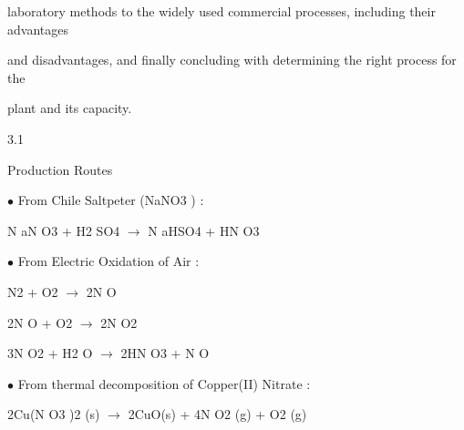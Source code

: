 \documentclass[a4paper,portrait,12pt]{article}
\begin{document}
\begin{flushleft}
laboratory methods to the widely used commercial processes, including their advantages
\end{flushleft}


\begin{flushleft}
and disadvantages, and finally concluding with determining the right process for the
\end{flushleft}


\begin{flushleft}
plant and its capacity.
\end{flushleft}





3.1





\begin{flushleft}
Production Routes
\end{flushleft}





\begin{flushleft}
$\bullet$ From Chile Saltpeter (NaNO3 ) :
\end{flushleft}


\begin{flushleft}
N aN O3 + H2 SO4 $\rightarrow$ N aHSO4 + HN O3
\end{flushleft}


\begin{flushleft}
$\bullet$ From Electric Oxidation of Air :
\end{flushleft}


\begin{flushleft}
N2 + O2 $\rightarrow$ 2N O
\end{flushleft}


\begin{flushleft}
2N O + O2 $\rightarrow$ 2N O2
\end{flushleft}


\begin{flushleft}
3N O2 + H2 O $\rightarrow$ 2HN O3 + N O
\end{flushleft}


\begin{flushleft}
$\bullet$ From thermal decomposition of Copper(II) Nitrate :
\end{flushleft}


\begin{flushleft}
2Cu(N O3 )2 (s) $\rightarrow$ 2CuO(s) + 4N O2 (g) + O2 (g)
\end{flushleft}
\end{document}
